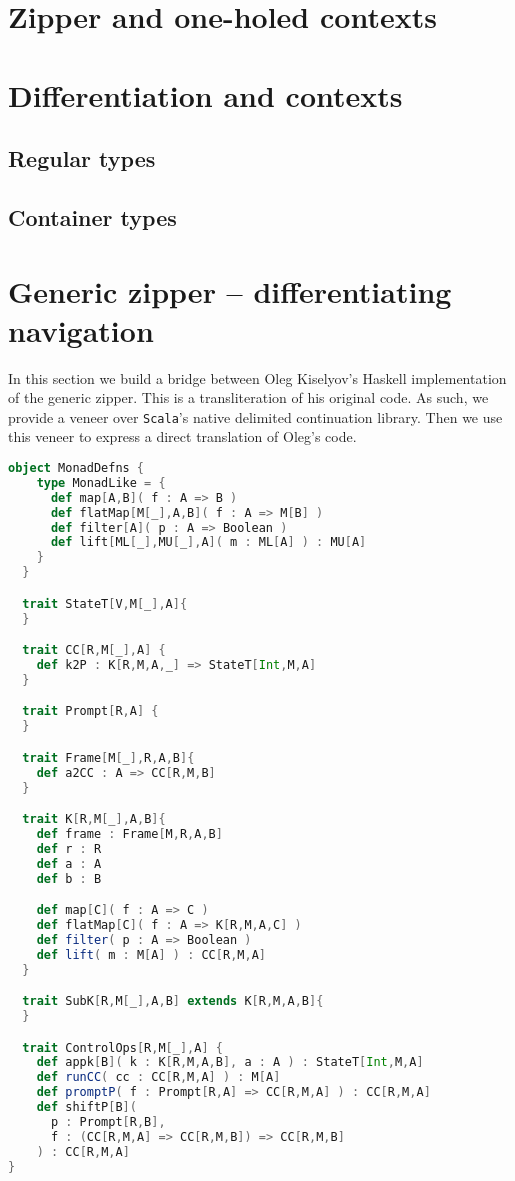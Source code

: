 \section{Zipper and one-holed contexts}

\section{Differentiation and contexts}

\subsection{Regular types}

\subsection{Container types}

\section{Generic zipper -- differentiating navigation}

In this section we build a bridge between Oleg Kiselyov's Haskell
implementation of the generic zipper. This is a transliteration of his
original code. As such, we provide a veneer over \texttt{Scala}'s
native delimited continuation library. Then we use this veneer to
express a direct translation of Oleg's code.

\begin{lstlisting}[language=Scala,mathescape=true]
  object MonadDefns {
    type MonadLike = { 
      def map[A,B]( f : A => B )
      def flatMap[M[_],A,B]( f : A => M[B] )
      def filter[A]( p : A => Boolean )
      def lift[ML[_],MU[_],A]( m : ML[A] ) : MU[A]
    }
  }

  trait StateT[V,M[_],A]{
  }

  trait CC[R,M[_],A] {
    def k2P : K[R,M,A,_] => StateT[Int,M,A]
  }

  trait Prompt[R,A] {
  }

  trait Frame[M[_],R,A,B]{
    def a2CC : A => CC[R,M,B]
  }

  trait K[R,M[_],A,B]{
    def frame : Frame[M,R,A,B]
    def r : R
    def a : A
    def b : B

    def map[C]( f : A => C )
    def flatMap[C]( f : A => K[R,M,A,C] )
    def filter( p : A => Boolean )
    def lift( m : M[A] ) : CC[R,M,A]
  }

  trait SubK[R,M[_],A,B] extends K[R,M,A,B]{
  }

  trait ControlOps[R,M[_],A] {
    def appk[B]( k : K[R,M,A,B], a : A ) : StateT[Int,M,A]
    def runCC( cc : CC[R,M,A] ) : M[A]
    def promptP( f : Prompt[R,A] => CC[R,M,A] ) : CC[R,M,A]
    def shiftP[B](
      p : Prompt[R,B],
      f : (CC[R,M,A] => CC[R,M,B]) => CC[R,M,B]
    ) : CC[R,M,A]
}
\end{lstlisting}

